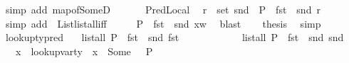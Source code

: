 \begin{isabellebody}
\ {\isacharparenleft}{\kern0pt}simp\ add{\isacharcolon}{\kern0pt}\ map{\isacharunderscore}{\kern0pt}of{\isacharunderscore}{\kern0pt}SomeD{\isacharparenright}{\kern0pt}\ \isanewline
\ \ \isamarkupfalse%
\ \isamarkupfalse%
\ PredLocal\ \isamarkupfalse%
\ {\isachardoublequoteopen}{\isasymforall}r\ {\isasymin}\ set\ {\isacharparenleft}{\kern0pt}snd\ {\isasymLambda}{\isacharparenright}{\kern0pt}{\isachardot}{\kern0pt}\ {\isacharparenleft}{\kern0pt}P\ {\isasymcirc}\ fst\ {\isasymcirc}\ snd{\isacharparenright}{\kern0pt}\ r{\isachardoublequoteclose}\ \isamarkupfalse%
\ {\isacharparenleft}{\kern0pt}simp\ add{\isacharcolon}{\kern0pt}\ \ List{\isachardot}{\kern0pt}list{\isacharunderscore}{\kern0pt}all{\isacharunderscore}{\kern0pt}iff{\isacharparenright}{\kern0pt}\isanewline
\ \ \isamarkupfalse%
\ \isamarkupfalse%
\ {\isachardoublequoteopen}{\isacharparenleft}{\kern0pt}P\ {\isasymcirc}\ fst\ {\isasymcirc}\ snd{\isacharparenright}{\kern0pt}\ {\isacharparenleft}{\kern0pt}x{\isacharcomma}{\kern0pt}{\isacharparenleft}{\kern0pt}{\isasymtau}{\isacharcomma}{\kern0pt}w{\isacharparenright}{\kern0pt}{\isacharparenright}{\kern0pt}{\isachardoublequoteclose}\ \isamarkupfalse%
\ blast\isanewline
\ \ \isamarkupfalse%
\ {\isacharquery}{\kern0pt}thesis\ \isamarkupfalse%
\ simp\isanewline
{}\isamarkupfalse%
%
\endisatagproof
{\isafoldproof}%
%
\isadelimproof
\isanewline
%
\endisadelimproof
\isanewline
{}\isamarkupfalse%
\ lookup{\isacharunderscore}{\kern0pt}ty{\isacharunderscore}{\kern0pt}pred{\isacharunderscore}{\kern0pt}{}{\isacharcolon}{\kern0pt}\isanewline
\ \ \ {\isachardoublequoteopen}list{\isacharunderscore}{\kern0pt}all\ {\isacharparenleft}{\kern0pt}P\ {\isasymcirc}\ {\isacharparenleft}{\kern0pt}fst\ {\isasymcirc}\ snd{\isacharparenright}{\kern0pt}{\isacharparenright}{\kern0pt}\ {\isacharparenleft}{\kern0pt}fst\ {\isasymLambda}{\isacharparenright}{\kern0pt}{\isachardoublequoteclose}\ \isanewline
\ \ \ \ \ \ \ \ \ \ {\isachardoublequoteopen}list{\isacharunderscore}{\kern0pt}all\ {\isacharparenleft}{\kern0pt}P\ {\isasymcirc}\ {\isacharparenleft}{\kern0pt}fst\ {\isasymcirc}\ snd{\isacharparenright}{\kern0pt}{\isacharparenright}{\kern0pt}\ {\isacharparenleft}{\kern0pt}snd\ {\isasymLambda}{\isacharparenright}{\kern0pt}{\isachardoublequoteclose}\isanewline
\ \ \ {\isachardoublequoteopen}{\isasymforall}x\ {\isasymtau}{\isachardot}{\kern0pt}\ lookup{\isacharunderscore}{\kern0pt}var{\isacharunderscore}{\kern0pt}ty\ {\isasymLambda}\ x\ {\isacharequal}{\kern0pt}\ Some\ {\isasymtau}\ {\isasymlongrightarrow}\ P\ {\isasymtau}{\isachardoublequoteclose}\isanewline

\end{isabellebody}
